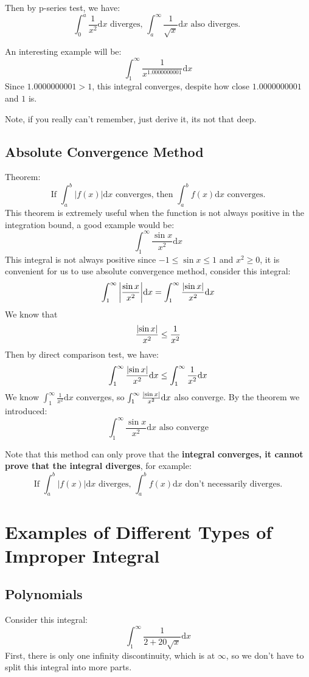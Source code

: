 \documentclass{article}
\begin{document}
Then by p-series test, we have:
\[
    \int_{0}^{a}\frac{1}{x^2}\mathrm{d}x \text{ diverges, } 
    \int_{a}^{\infty}\frac{1}{\sqrt{x}}\mathrm{d}x \text{ also diverges. }
\]

An interesting example will be:
\[
    \int_{1}^{\infty} \frac{1}{x^{1.0000000001}}\mathrm{d}x
\]
Since $1.0000000001>1$, this integral converges, despite how close $1.0000000001$ and $1$ is.

Note, if you really can't remember, just derive it, its not that deep.

\newpage
\subsection{Absolute Convergence Method}
Theorem:
\[
    \text{If } \int_{a}^{b} |f(x)| \mathrm{d}x \text{ converges, then } \int_{a}^{b} f(x) \mathrm{d}x \text{ converges.}
\]
This theorem is extremely useful when the function is not always positive in the integration bound, a good example would be:
\[
    \int_{1}^{\infty}\frac{\sin x}{x^2}\mathrm{d}x
\]
This integral is not always positive since $-1\leq \sin x \leq 1$ and $x^2\geq 0$, it is convenient for us to use absolute convergence method, consider this integral:
\[
    \int_{1}^{\infty} \abs{\frac{\sin x}{x^2}} \mathrm{d}x = \int_{1}^{\infty} \frac{\abs{\sin x}}{x^2} \mathrm{d}x
\]
We know that 
\[  
    \frac{\abs{\sin x}}{x^2} \leq \frac{1}{x^2}
\]
Then by direct comparison test, we have:
\[
    \int_{1}^{\infty} \frac{\abs{\sin x}}{x^2} \mathrm{d}x \leq \int_{1}^{\infty} \frac{1}{x^2} \mathrm{d}x
\]
We know $\int_{1}^{\infty} \frac{1}{x^2} \mathrm{d}x$ converges, so $ \int_{1}^{\infty} \frac{\abs{\sin x}}{x^2} \mathrm{d}x$ also converge. By the theorem we introduced:
\[
    \int_{1}^{\infty}\frac{\sin x}{x^2}\mathrm{d}x \text{ also converge}
\]

Note that this method can only prove that the \textbf{integral converges, it cannot prove that the integral diverges}, for example:
\[
    \text{If } \int_{a}^{b} |f(x)| \mathrm{d}x \text{ diverges, } \int_{a}^{b} f(x) \mathrm{d}x \text{ don't necessarily diverges.}
\]

\newpage
\section{Examples of Different Types of Improper Integral}
\subsection{Polynomials}
Consider this integral:
\[
    \int_{1}^{\infty} \frac{1}{2+20\sqrt{x}}\mathrm{d}x
\]
First, there is only one infinity discontinuity, which is at $\infty$, so we don't have to split this integral into more parts.
\end{document}
